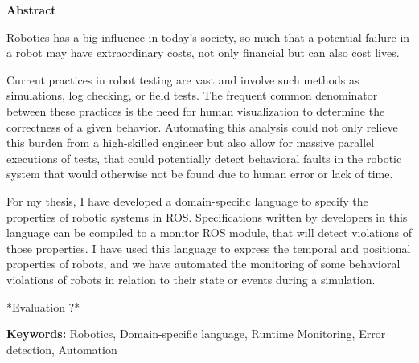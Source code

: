 \vspace*{2cm}
\begin{center}
\Large \bf Abstract
\end{center}
\vspace*{1cm} \setlength{\baselineskip}{0.6cm}

Robotics has a big influence in today's society, so much that a potential failure in a robot may have extraordinary costs, not only financial but can also cost lives.

Current practices in robot testing are vast and involve such methods as simulations, log checking, or field tests. The frequent common denominator between these practices is the need for human visualization to determine the correctness of a given behavior. Automating this analysis could not only relieve this burden from a high-skilled engineer but also allow for massive parallel executions of tests, that could potentially detect behavioral faults in the robotic system that would otherwise not be found due to human error or lack of time.

For my thesis, I have developed a domain-specific language to specify the properties of robotic systems in ROS. Specifications written by developers in this language can be compiled to a monitor ROS module, that will detect violations of those properties. I have used this language to express the temporal and positional properties of robots, and we have automated the monitoring of some behavioral violations of robots in relation to their state or events during a simulation.

*Evaluation ?*

\vfill

\begin{flushleft}
\textbf{Keywords:}
Robotics, Domain-specific language, Runtime Monitoring, Error detection, Automation
\end{flushleft}
